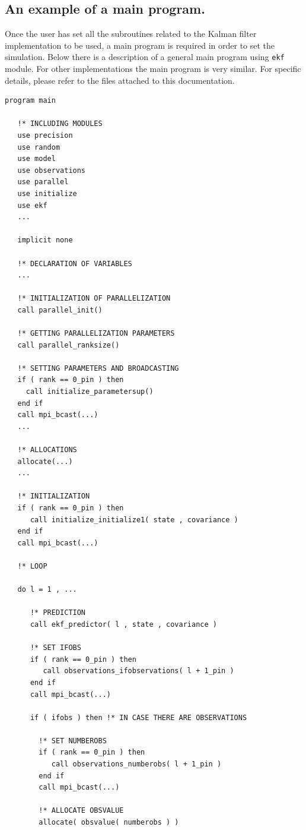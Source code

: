 \documentclass[12pt]{article}
\begin{document}
\subsection{An example of a main program.} \label{subsection: example of a main program}
Once the user has set all the subroutines related to the Kalman filter implementation to be used, a main program is required in order to set the simulation. Below there is a description of a general main program using {\tt ekf} module. For other implementations the main program is very similar. For specific details, please refer to the files attached to this documentation.

\begin{verbatim}
program main

   !* INCLUDING MODULES
   use precision
   use random
   use model
   use observations
   use parallel
   use initialize
   use ekf
   ...
	
   implicit none

   !* DECLARATION OF VARIABLES
   ...

   !* INITIALIZATION OF PARALLELIZATION
   call parallel_init()

   !* GETTING PARALLELIZATION PARAMETERS
   call parallel_ranksize()

   !* SETTING PARAMETERS AND BROADCASTING
   if ( rank == 0_pin ) then
     call initialize_parametersup()
   end if
   call mpi_bcast(...)
   ...
 
   !* ALLOCATIONS
   allocate(...)
   ...   

   !* INITIALIZATION
   if ( rank == 0_pin ) then
      call initialize_initialize1( state , covariance )
   end if
   call mpi_bcast(...)

   !* LOOP

   do l = 1 , ...

      !* PREDICTION
      call ekf_predictor( l , state , covariance ) 

      !* SET IFOBS
      if ( rank == 0_pin ) then
         call observations_ifobservations( l + 1_pin )         
      end if
      call mpi_bcast(...)
   
      if ( ifobs ) then !* IN CASE THERE ARE OBSERVATIONS     
   
        !* SET NUMBEROBS    
        if ( rank == 0_pin ) then
           call observations_numberobs( l + 1_pin )
        end if
        call mpi_bcast(...)

        !* ALLOCATE OBSVALUE
        allocate( obsvalue( numberobs ) )


\end{verbatim}
\end{document}
